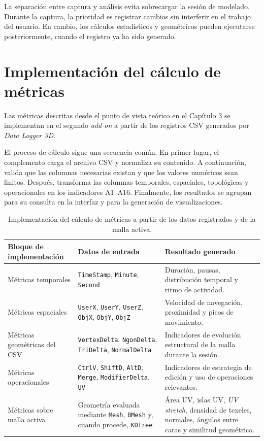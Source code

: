 La separación entre captura y análisis evita sobrecargar la sesión de modelado. Durante la captura, la prioridad es registrar cambios sin interferir en el trabajo del usuario. En cambio, los cálculos estadísticos y geométricos pueden ejecutarse posteriormente, cuando el registro ya ha sido generado.

\section{Implementación del cálculo de métricas}

Las métricas descritas desde el punto de vista teórico en el Capítulo 3 se implementan en el segundo \textit{add-on} a partir de los registros CSV generados por \textit{Data Logger 3D}.

El proceso de cálculo sigue una secuencia común. En primer lugar, el complemento carga el archivo CSV y normaliza su contenido. A continuación, valida que las columnas necesarias existan y que los valores numéricos sean finitos. Después, transforma las columnas temporales, espaciales, topológicas y operacionales en los indicadores A1--A16. Finalmente, los resultados se agrupan para su consulta en la interfaz y para la generación de visualizaciones.

\begin{table}[H]
\centering
\small
\begin{tabularx}{\textwidth}{p{}p{}X}
\toprule
\textbf{Bloque de implementación} & \textbf{Datos de entrada} & \textbf{Resultado generado} \\
\midrule
Métricas temporales & \texttt{TimeStamp}, \texttt{Minute}, \texttt{Second} & Duración, pausas, distribución temporal y ritmo de actividad. \\
Métricas espaciales & \texttt{UserX}, \texttt{UserY}, \texttt{UserZ}, \texttt{ObjX}, \texttt{ObjY}, \texttt{ObjZ} & Velocidad de navegación, proximidad y picos de movimiento. \\
Métricas geométricas del CSV & \texttt{VertexDelta}, \texttt{NgonDelta}, \texttt{TriDelta}, \texttt{NormalDelta} & Indicadores de evolución estructural de la malla durante la sesión. \\
Métricas operacionales & \texttt{CtrlV}, \texttt{ShiftD}, \texttt{AltD}, \texttt{Merge}, \texttt{ModifierDelta}, \texttt{UV} & Indicadores de estrategia de edición y uso de operaciones relevantes. \\
Métricas sobre malla activa & Geometría evaluada mediante \texttt{Mesh}, \texttt{BMesh} y, cuando procede, \texttt{KDTree} & Área UV, islas UV, \textit{UV stretch}, densidad de texeles, normales, ángulos entre caras y similitud geométrica. \\
\bottomrule
\end{tabularx}
\caption{Implementación del cálculo de métricas a partir de los datos registrados y de la malla activa.}
\label{tab:implementacion_metricas}
\end{table}

